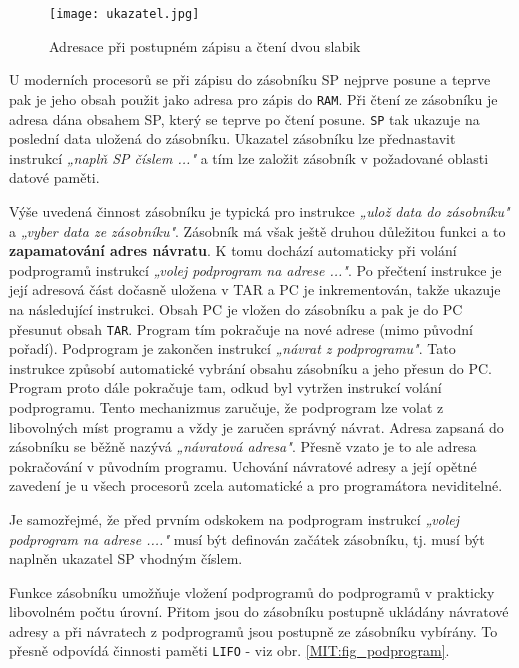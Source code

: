     
    \begin{figure}[ht!] %
      \centering
      \texttt{[image: ukazatel.jpg]}
      \caption{Adresace při postupném zápisu a čtení dvou slabik}
      \label{MIT:fig_ukazatel}
    \end{figure}
    
    U moderních procesorů se při zápisu do zásobníku SP nejprve posune a teprve pak je jeho obsah 
    použit jako adresa pro zápis do \texttt{RAM}. Při čtení ze zásobníku je adresa dána obsahem SP, 
    který se teprve po čtení posune. \texttt{SP} tak ukazuje na poslední data uložená do zásobníku. 
    Ukazatel zásobníku lze přednastavit instrukcí \emph{„naplň SP číslem ..."} a tím lze založit 
    zásobník v požadované oblasti datové paměti.
    
    Výše uvedená činnost zásobníku je typická pro instrukce \emph{„ulož data do zásobníku"} a 
    \emph{„vyber data ze zásobníku"}. Zásobník má však ještě druhou důležitou funkci a to 
    \textbf{zapamatování adres návratu}. K tomu dochází automaticky při volání podprogramů 
    instrukcí \emph{„volej podprogram na adrese ..."}. Po přečtení instrukce je její adresová část 
    dočasně uložena v TAR a PC je inkrementován, takže ukazuje na následující instrukci. Obsah PC 
    je vložen do zásobníku a pak je do PC přesunut obsah \texttt{TAR}. Program tím pokračuje na 
    nové adrese (mimo původní pořadí). Podprogram je zakončen instrukcí \emph{„návrat z 
    podprogramu"}. Tato instrukce způsobí automatické vybrání obsahu zásobníku a jeho přesun 
    do PC. Program proto dále pokračuje tam, odkud byl vytržen instrukcí volání podprogramu. Tento 
    mechanizmus zaručuje, že podprogram lze volat z libovolných míst programu a vždy je zaručen 
    správný návrat. Adresa zapsaná do zásobníku se běžně nazývá \emph{„návratová adresa"}. Přesně 
    vzato je to ale adresa pokračování v původním programu. Uchování návratové adresy a její opětné 
    zavedení je u všech procesorů zcela automatické a pro programátora neviditelné.
    
    Je samozřejmé, že před prvním odskokem na podprogram instrukcí \emph{„volej podprogram na 
    adrese ...."} musí být definován začátek zásobníku, tj. musí být naplněn ukazatel SP vhodným 
    číslem.
    
    Funkce zásobníku umožňuje vložení podprogramů do podprogramů v prakticky libovolném počtu 
    úrovní. Přitom jsou do zásobníku postupně ukládány návratové adresy a při návratech z 
    podprogramů jsou postupně ze zásobníku vybírány. To přesně odpovídá činnosti paměti 
    \texttt{LIFO} - viz obr. \ref{MIT:fig_podprogram}.
    
